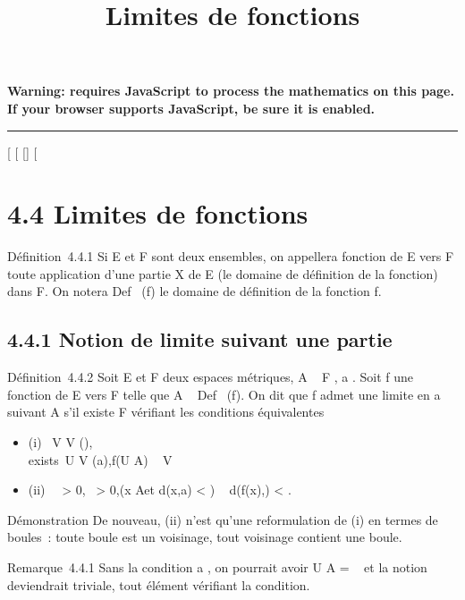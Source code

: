 \documentclass[]{article}
\title{Limites de fonctions}
\author{}
\date{}
\begin{document}
\maketitle

\textbf{Warning: 
requires JavaScript to process the mathematics on this page.\\ If your
browser supports JavaScript, be sure it is enabled.}

\begin{center}\rule{3in}{0.4pt}\end{center}

[
[
[]
[

\section{4.4 Limites de fonctions}

Définition~4.4.1 Si E et F sont deux ensembles, on appellera fonction de
E vers F toute application d'une partie X de E (le domaine de définition
de la fonction) dans F. On notera Def~ (f) le
domaine de définition de la fonction f.

\subsection{4.4.1 Notion de limite suivant une partie}

Définition~4.4.2 Soit E et F deux espaces métriques, A \subset~ F , a
\in\overlineA. Soit f une fonction de E vers F telle
que A \subset~ Def~ (f). On dit que f admet une limite
en a suivant A s'il existe \ell \in F vérifiant les conditions équivalentes

\begin{itemize}
\itemsep1pt\parskip0pt
\item
  (i) \forall~V \in V (\ell), \\exists~U
  \in V (a),\quad f(U \bigcap A) \subset~ V
\item
  (ii) \forall~~\epsilon > 0,
  \exists~\eta > 0,\quad (x
  \in A\text et d(x,a) < \eta) \rigtharrow~ d(f(x),\ell)
  < \epsilon.
\end{itemize}

Démonstration De nouveau, (ii) n'est qu'une reformulation de (i) en
termes de boules~: toute boule est un voisinage, tout voisinage contient
une boule.

Remarque~4.4.1 Sans la condition a \in\overlineA, on
pourrait avoir U \bigcap A = \varnothing~ et la notion deviendrait triviale, tout élément
\ell vérifiant la condition.
\end{document}
